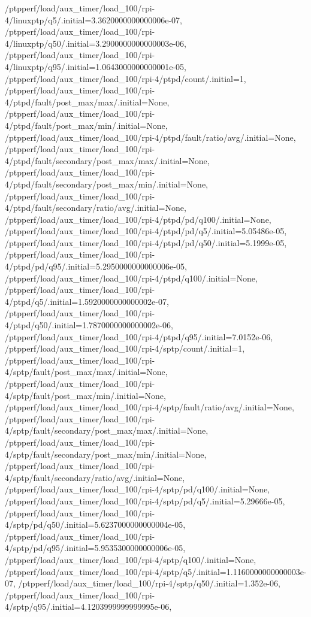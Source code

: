 {    /ptpperf/load/aux_timer/load_100/rpi-4/linuxptp/q5/.initial=3.3620000000000006e-07,
    /ptpperf/load/aux_timer/load_100/rpi-4/linuxptp/q50/.initial=3.2900000000000003e-06,
    /ptpperf/load/aux_timer/load_100/rpi-4/linuxptp/q95/.initial=1.0643000000000001e-05,
    /ptpperf/load/aux_timer/load_100/rpi-4/ptpd/count/.initial=1,
    /ptpperf/load/aux_timer/load_100/rpi-4/ptpd/fault/post_max/max/.initial=None,
    /ptpperf/load/aux_timer/load_100/rpi-4/ptpd/fault/post_max/min/.initial=None,
    /ptpperf/load/aux_timer/load_100/rpi-4/ptpd/fault/ratio/avg/.initial=None,
    /ptpperf/load/aux_timer/load_100/rpi-4/ptpd/fault/secondary/post_max/max/.initial=None,
    /ptpperf/load/aux_timer/load_100/rpi-4/ptpd/fault/secondary/post_max/min/.initial=None,
    /ptpperf/load/aux_timer/load_100/rpi-4/ptpd/fault/secondary/ratio/avg/.initial=None,
    /ptpperf/load/aux_timer/load_100/rpi-4/ptpd/pd/q100/.initial=None,
    /ptpperf/load/aux_timer/load_100/rpi-4/ptpd/pd/q5/.initial=5.05486e-05,
    /ptpperf/load/aux_timer/load_100/rpi-4/ptpd/pd/q50/.initial=5.1999e-05,
    /ptpperf/load/aux_timer/load_100/rpi-4/ptpd/pd/q95/.initial=5.2950000000000006e-05,
    /ptpperf/load/aux_timer/load_100/rpi-4/ptpd/q100/.initial=None,
    /ptpperf/load/aux_timer/load_100/rpi-4/ptpd/q5/.initial=1.5920000000000002e-07,
    /ptpperf/load/aux_timer/load_100/rpi-4/ptpd/q50/.initial=1.7870000000000002e-06,
    /ptpperf/load/aux_timer/load_100/rpi-4/ptpd/q95/.initial=7.0152e-06,
    /ptpperf/load/aux_timer/load_100/rpi-4/sptp/count/.initial=1,
    /ptpperf/load/aux_timer/load_100/rpi-4/sptp/fault/post_max/max/.initial=None,
    /ptpperf/load/aux_timer/load_100/rpi-4/sptp/fault/post_max/min/.initial=None,
    /ptpperf/load/aux_timer/load_100/rpi-4/sptp/fault/ratio/avg/.initial=None,
    /ptpperf/load/aux_timer/load_100/rpi-4/sptp/fault/secondary/post_max/max/.initial=None,
    /ptpperf/load/aux_timer/load_100/rpi-4/sptp/fault/secondary/post_max/min/.initial=None,
    /ptpperf/load/aux_timer/load_100/rpi-4/sptp/fault/secondary/ratio/avg/.initial=None,
    /ptpperf/load/aux_timer/load_100/rpi-4/sptp/pd/q100/.initial=None,
    /ptpperf/load/aux_timer/load_100/rpi-4/sptp/pd/q5/.initial=5.29666e-05,
    /ptpperf/load/aux_timer/load_100/rpi-4/sptp/pd/q50/.initial=5.6237000000000004e-05,
    /ptpperf/load/aux_timer/load_100/rpi-4/sptp/pd/q95/.initial=5.9535300000000006e-05,
    /ptpperf/load/aux_timer/load_100/rpi-4/sptp/q100/.initial=None,
    /ptpperf/load/aux_timer/load_100/rpi-4/sptp/q5/.initial=1.1160000000000003e-07,
    /ptpperf/load/aux_timer/load_100/rpi-4/sptp/q50/.initial=1.352e-06,
    /ptpperf/load/aux_timer/load_100/rpi-4/sptp/q95/.initial=4.1203999999999995e-06,
}
